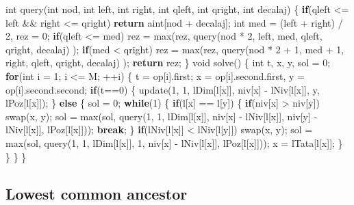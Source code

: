 \documentclass[10pt,]{article}
\newenvironment{Shaded}{}{}
\newcommand{\KeywordTok}[1]{\textcolor[rgb]{0.00,0.44,0.13}{\textbf{{#1}}}}
\newcommand{\DataTypeTok}[1]{\textcolor[rgb]{0.56,0.13,0.00}{{#1}}}
\newcommand{\DecValTok}[1]{\textcolor[rgb]{0.25,0.63,0.44}{{#1}}}
\newcommand{\NormalTok}[1]{{#1}}
\begin{document}
\begin{Shaded}
\begin{Highlighting}[]
\DataTypeTok{int} \NormalTok{query(}\DataTypeTok{int} \NormalTok{nod, }\DataTypeTok{int} \NormalTok{left, }\DataTypeTok{int} \NormalTok{right, }\DataTypeTok{int} \NormalTok{qleft, }\DataTypeTok{int} \NormalTok{qright, }\DataTypeTok{int} \NormalTok{decalaj) \{}
  \KeywordTok{if}\NormalTok{(qleft <= left && right <= qright)}
    \KeywordTok{return} \NormalTok{aint[nod + decalaj];}
  \DataTypeTok{int} \NormalTok{med = (left + right) / }\DecValTok{2}\NormalTok{, rez = }\DecValTok{0}\NormalTok{;}
  \KeywordTok{if}\NormalTok{(qleft <= med)}
    \NormalTok{rez = max(rez, query(nod * }\DecValTok{2}\NormalTok{, left, med, qleft, qright, decalaj) );}
  \KeywordTok{if}\NormalTok{(med < qright)}
    \NormalTok{rez = max(rez, query(nod * }\DecValTok{2} \NormalTok{+ }\DecValTok{1}\NormalTok{, med + }\DecValTok{1}\NormalTok{, right, qleft, qright, decalaj) );}
  \KeywordTok{return} \NormalTok{rez;}
\NormalTok{\}}
\DataTypeTok{void} \NormalTok{solve() \{}
  \DataTypeTok{int} \NormalTok{t, x, y, sol = }\DecValTok{0}\NormalTok{;}
  \KeywordTok{for}\NormalTok{(}\DataTypeTok{int} \NormalTok{i = }\DecValTok{1}\NormalTok{; i <= M; ++i) \{}
    \NormalTok{t = op[i].first; x = op[i].second.first, y = op[i].second.second;}
    \KeywordTok{if}\NormalTok{(t==}\DecValTok{0}\NormalTok{) \{}
      \NormalTok{update(}\DecValTok{1}\NormalTok{, }\DecValTok{1}\NormalTok{, lDim[l[x]], niv[x] - lNiv[l[x]], y, lPoz[l[x]]);}
    \NormalTok{\} }\KeywordTok{else} \NormalTok{\{}
      \NormalTok{sol = }\DecValTok{0}\NormalTok{;}
      \KeywordTok{while}\NormalTok{(}\DecValTok{1}\NormalTok{) \{}
        \KeywordTok{if}\NormalTok{(l[x] == l[y]) \{}
          \KeywordTok{if}\NormalTok{(niv[x] > niv[y])}
            \NormalTok{swap(x, y);}
          \NormalTok{sol = max(sol, query(}\DecValTok{1}\NormalTok{, }\DecValTok{1}\NormalTok{, lDim[l[x]], niv[x] - lNiv[l[x]], niv[y] - lNiv[l[x]], lPoz[l[x]]));}
          \KeywordTok{break}\NormalTok{;}
        \NormalTok{\}}
        \KeywordTok{if}\NormalTok{(lNiv[l[x]] < lNiv[l[y]])}
          \NormalTok{swap(x, y);}
        \NormalTok{sol = max(sol, query(}\DecValTok{1}\NormalTok{, }\DecValTok{1}\NormalTok{, lDim[l[x]], }\DecValTok{1}\NormalTok{, niv[x] - lNiv[l[x]], lPoz[l[x]]));}
        \NormalTok{x = lTata[l[x]];}
      \NormalTok{\}}
    \NormalTok{\}}
  \NormalTok{\}}
\NormalTok{\}}
\end{Highlighting}
\end{Shaded}

\subsection{Lowest common ancestor}
\end{document}
